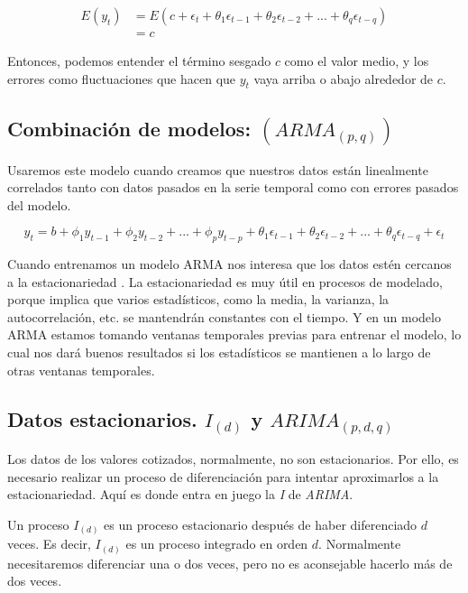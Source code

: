 \begin{equation}
\begin{aligned}
	E(y_{t}) &= E(c + \epsilon_{t} + \theta_{1}\epsilon_{t-1} + \theta_{2}\epsilon_{t-2} + ... + \theta_{q}\epsilon_{t-q}) \\ 
	&= c
\end{aligned}
\end{equation}

Entonces, podemos entender el término sesgado $c$ como el valor medio, y los errores como fluctuaciones que hacen que $y_{t}$ vaya arriba o abajo alrededor de $c$. 


\subsection{Combinación de modelos: $(ARMA_{(p, q)})$}

Usaremos este modelo cuando creamos que nuestros datos están linealmente correlados tanto con datos pasados en la serie temporal como con errores pasados del modelo. 

\begin{equation}
	y_{t} = b + \phi_{1}y_{t-1} + \phi_{2}y_{t-2} + ... + \phi_{p}y_{t-p} + \theta_{1}\epsilon_{t-1} + \theta_{2}\epsilon_{t-2} + ... + \theta_{q}\epsilon_{t-q} + \epsilon_{t}
\end{equation}

Cuando entrenamos un modelo ARMA nos interesa que los datos estén cercanos a la estacionariedad \citep{wiki:proceso_estacionario}. La estacionariedad es muy útil en procesos de modelado, porque implica que varios estadísticos, como la media, la varianza, la autocorrelación, etc. se mantendrán constantes con el tiempo. Y en un modelo ARMA estamos tomando ventanas temporales previas para entrenar el modelo, lo cual nos dará buenos resultados si los estadísticos se mantienen a lo largo de otras ventanas temporales. 


\subsection{Datos estacionarios. $I_{(d)}$ y $ARIMA_{(p, d, q)}$}

Los datos de los valores cotizados, normalmente, no son estacionarios. Por ello, es necesario realizar un proceso de diferenciación para intentar aproximarlos a la estacionariedad. Aquí es donde entra en juego la \emph{I} de \emph{ARIMA}. 

Un proceso $I_{(d)}$ es un proceso estacionario después de haber diferenciado $d$ veces. Es decir, $I_{(d)}$ es un proceso integrado en orden $d$. Normalmente necesitaremos diferenciar una o dos veces, pero no es aconsejable hacerlo más de dos veces. 

